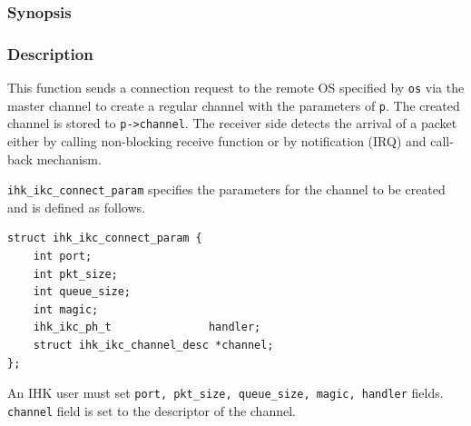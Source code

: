 \documentclass[twoside,11pt,fleqn]{book}
\begin{document}
\subsubsection{}
\subsubsection*{Synopsis}{\quad}
\subsubsection*{Description}{\quad}
This function sends a connection request to the remote OS specified by \texttt{os} via the master channel to create a regular channel with the parameters of \texttt{p}. The created channel is stored to \texttt{p->channel}.
The receiver side detects the arrival of a packet either by calling non-blocking receive function or by notification (IRQ) and call-back mechanism.


\texttt{ihk\_ikc\_connect\_param} specifies the parameters for the channel to be created and is defined as follows.
\begin{verbatim}
struct ihk_ikc_connect_param {
    int port;
    int pkt_size;
    int queue_size;
    int magic;
    ihk_ikc_ph_t               handler;
    struct ihk_ikc_channel_desc *channel;
};
\end{verbatim}
\begin{structdef}
\end{structdef}
An IHK user must set \texttt{port, pkt\_size, queue\_size, magic, handler} fields.
\texttt{channel} field is set to the descriptor of the channel.
\end{document}
